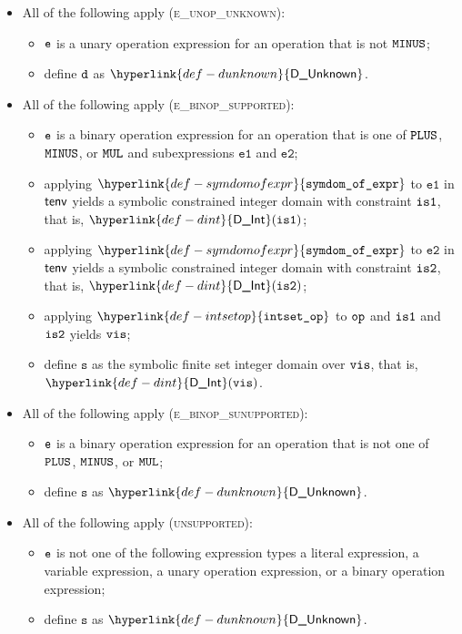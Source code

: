 \documentclass{book}
\newcommand\DInt[0]{\hyperlink{def-dint}{\textsf{D\_Int}}}
\newcommand\DUnknown[0]{\hyperlink{def-dunknown}{\textsf{D\_Unknown}}}
\newcommand\symdomofexpr[0]{\hyperlink{def-symdomofexpr}{\texttt{symdom\_of\_expr}}}
\newcommand\intsetop[0]{\hyperlink{def-intsetop}{\texttt{intset\_op}}}
\newcommand\veone[0]{\texttt{e1}}
\newcommand\vetwo[0]{\texttt{e2}}
\newcommand\vs[0]{\texttt{s}}
\begin{document}
\begin{itemize}
  \item All of the following apply (\textsc{e\_unop\_unknown}):
  \begin{itemize}
    \item $\texttt{e}$ is a unary operation expression for an operation that is not $\texttt{MINUS}$;
    \item define $\texttt{d}$ as $\DUnknown$.
  \end{itemize}

  \item All of the following apply (\textsc{e\_binop\_supported}):
  \begin{itemize}
    \item $\texttt{e}$ is a binary operation expression for an operation that is one of $\texttt{PLUS}$, $\texttt{MINUS}$, or $\texttt{MUL}$
          and subexpressions $\veone$ and $\vetwo$;
    \item applying $\symdomofexpr$ to $\veone$ in $\textsf{tenv}$ yields a symbolic constrained integer domain with constraint $\texttt{is1}$,
          that is, $\DInt(\visone)$;
    \item applying $\symdomofexpr$ to $\vetwo$ in $\textsf{tenv}$ yields a symbolic constrained integer domain with constraint $\texttt{is2}$,
          that is, $\DInt(\vistwo)$;
    \item applying $\intsetop$ to $\texttt{op}$ and $\texttt{is1}$ and $\texttt{is2}$ yields $\texttt{vis}$;
    \item define $\vs$ as the symbolic finite set integer domain over $\texttt{vis}$, that is, $\DInt(\vis)$.
  \end{itemize}

  \item All of the following apply (\textsc{e\_binop\_sunupported}):
  \begin{itemize}
    \item $\texttt{e}$ is a binary operation expression for an operation that is not one of $\texttt{PLUS}$, $\texttt{MINUS}$, or $\texttt{MUL}$;
    \item define $\vs$ as $\DUnknown$.
  \end{itemize}

  \item All of the following apply (\textsc{unsupported}):
  \begin{itemize}
    \item $\texttt{e}$ is not one of the following expression types a literal expression, a variable expression, a unary operation
          expression, or a binary operation expression;
    \item define $\vs$ as $\DUnknown$.
  \end{itemize}
\end{itemize}
\end{document}
